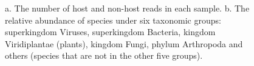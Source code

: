 \documentclass[11pt]{article}
\begin{document}
\begin{figure}[H]
        \caption{a. The number of host and non-host reads in each sample. 
        b. The relative abundance of species under six taxonomic groups: superkingdom Viruses, superkingdom Bacteria, kingdom Viridiplantae (plants), kingdom Fungi, phylum Arthropoda and others (species that are not in the other five groups).}
        \label{GroupAbundance}
        \end{figure}
    
\end{document}
